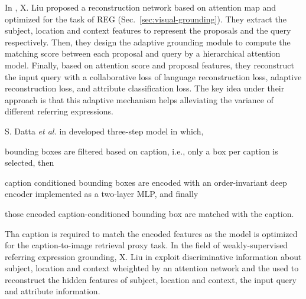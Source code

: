 In \cite{liu2019adaptive}, X. Liu \etal{} proposed a reconstruction
network based on attention map and optimized for the task of REG
(Sec.~\ref{sec:visual-grounding}). They extract the subject, location
and context features to represent the proposals and the query
respectively. Then, they design the adaptive grounding module to
compute the matching score between each proposal and query by a
hierarchical attention model. Finally, based on attention score and
proposal features, they reconstruct the input query with a
collaborative loss of language reconstruction loss, adaptive
reconstruction loss, and attribute classification loss. The key idea
under their approach is that this adaptive mechanism helps alleviating
the variance of different referring expressions.


S. Datta \textit{et al.} in  developed three-step
model in which, 
\begin{enumerate*}[label=(\roman*)] 
    \item bounding boxes are filtered based on caption, i.e., only a
    box per caption is selected, then
    \item caption conditioned bounding boxes are encoded with an
    order-invariant deep encoder implemented as a two-layer MLP, and
    finally
    \item those encoded caption-conditioned bounding box are matched
with the caption.
\end{enumerate*}
Tha caption is required to match the encoded features as the model is
optimized for the caption-to-image retrieval proxy task. In the field of weakly-supervised referring
expression grounding, X. Liu \etal{} in 
exploit discriminative information about subject, location and context
wheighted by an attention network and the used to reconstruct the
hidden features of subject, location and context, the input query and
attribute information.

